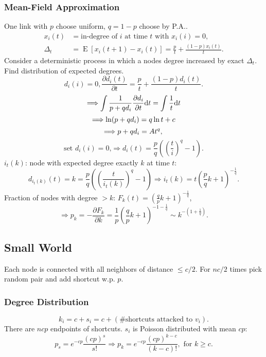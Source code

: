 \documentclass[a4paper,twocolumn,10pt]{article}
\newcommand{\pte}[1]{\left({#1}\right)}
\newcommand{\E}{\operatorname{E}}
\newcommand{\dd}{\mathrm{d}}
\begin{document}
	\subsubsection{Mean-Field Approximation}
		One link with $p$ choose uniform, $q=1-p$ choose by P.A..
		\[ \begin{split}
			x_i(t) &= \textrm{in-degree of $i$ at time $t$ with $x_i(i)=0$}, \\
			\Delta_t &= \E[x_i(t+1)-x_i(t)]  = \frac{p}{t} + \frac{(1-p)x_i(t)}{t}.
		\end{split} \]
		Consider a deterministic process in which a nodes degree increased by exact $\Delta_t$.
		Find distribution of expected degrees.
		\[
			d_i(i) = 0, \frac{\partial d_i(t)}{\partial t} = \frac{p}{t} + \frac{(1-p)d_i(t)}{t}.
		\]
		\[
			\Longrightarrow \int \frac{1}{p+q d_i} \frac{\partial d_i}{\partial t} \dd t = \int \frac{1}{t} \dd t \\
		\] \[
			\Longrightarrow \ln(p+q d_i) = q \ln t + c \\
		\] \[
			\Longrightarrow p+q d_i = A t^q, \\
		\] \[
			\textrm{set $d_i(i)=0$,}\Longrightarrow d_i(t) = \frac{p}{q}\pte{\pte{\frac{t}{i}}^q-1}.
		\]
		$i_t(k)$: node with expected degree exactly $k$ at time $t$:
		\[
			d_{i_t(k)}(t) = k = \frac{p}{q}\pte{\pte{\frac{t}{i_t(k)}}^q-1}
			\Longrightarrow
			i_t(k)=t\pte{\frac{p}{q}k+1}^{-\frac{1}{q}}.
		\]
		Fraction of nodes with degree $>k$:
			$F_k(t) = \pte{\frac{q}{p}k+1} ^ {-\frac{1}{q}}$,
		\[
			\Longrightarrow
			p_k=-\frac{\partial F_k}{\partial k}
			=\frac{1}{p}\pte{\frac{q}{p}k+1}^{-1-\frac{1}{q}}
			\sim k^{-\pte{1+\frac{1}{q}}}.
		\]

\subsection{Small World}
	Each node is connected with all neighbors of distance $\le c/2$.
	For $nc/2$ times pick random pair and add shortcut w.p. $p$.

	\subsubsection{Degree Distribution}
		\[
			k_i = c + s_i = c + (\#\textrm{shortcuts attacked to $v_i$}).
		\]
		There are $ncp$ endpoints of shortcuts. $s_i$ is Poisson distributed
			with mean $cp$:
		\[
			p_s = e^{-cp}\frac{(cp)^s}{s!} \Longrightarrow
			p_k = e^{-cp}\frac{(cp)^{k - c}}{(k - c)!}, \textrm{ for }k \ge c.
		\]
	
\end{document}
